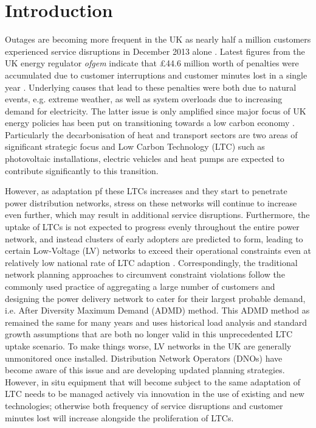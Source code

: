 \section{Introduction}
\label{ch2:sec:introduction}

Outages are becoming more frequent in the UK as nearly half a million customers experienced service disruptions in December 2013 alone \cite{Ofgem2014}.
Latest figures from the UK energy regulator \textit{ofgem} indicate that \pounds44.6 million worth of penalties were accumulated due to customer interruptions and customer minutes lost in a single year \cite{Ofgem2012}.
Underlying causes that lead to these penalties were both due to natural events, e.g. extreme weather, as well as system overloads due to increasing demand for electricity.
The latter issue is only amplified since major focus of UK energy policies has been put on transitioning towards a low carbon economy \cite{HMGovernment2009, RoyalAcademyofEngineering2010}.
Particularly the decarbonisation of heat and transport sectors are two areas of significant strategic focus and Low Carbon Technology (LTC) such as photovoltaic installations, electric vehicles and heat pumps are expected to contribute significantly to this transition.

However, as adaptation pf these LTCs increases and they start to penetrate power distribution networks, stress on these networks will continue to increase even further, which may result in additional service disruptions.
Furthermore, the uptake of LTCs is not expected to progress evenly throughout the entire power network, and instead clusters of early adopters are predicted to form, leading to certain Low-Voltage (LV) networks to exceed their operational constraints even at relatively low national rate of LTC adaption \cite{Poghosyan2014}.
Correspondingly, the traditional network planning approaches to circumvent constraint violations follow the commonly used practice of aggregating a large number of customers and designing the power delivery network to cater for their largest probable demand, i.e. After Diversity Maximum Demand (ADMD) method.
This ADMD method as remained the same for many years and uses historical load analysis and standard growth assumptions that are both no longer valid in this unprecedented LTC uptake scenario.
To make things worse, LV networks in the UK are generally unmonitored once installed.
Distribution Network Operators (DNOs) have become aware of this issue and are developing updated planning strategies.
However, in situ equipment that will become subject to the same adaptation of LTC needs to be managed actively via innovation in the use of existing and new technologies; otherwise both frequency of service disruptions and customer minutes lost will increase alongside the proliferation of LTCs.

